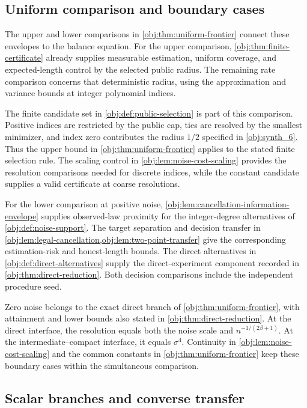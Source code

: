 \documentclass[11pt]{article}
\begin{document}
\subsection{Uniform comparison and boundary cases}

The upper and lower comparisons in \cref{obj:thm:uniform-frontier} connect these envelopes to the balance equation. For the upper comparison, \cref{obj:thm:finite-certificate} already supplies measurable estimation, uniform coverage, and expected-length control by the selected public radius. The remaining rate comparison concerns that deterministic radius, using the approximation and variance bounds at integer polynomial indices.

The finite candidate set in \cref{obj:def:public-selection} is part of this comparison. Positive indices are restricted by the public cap, ties are resolved by the smallest minimizer, and index zero contributes the radius \(1/2\) specified in \cref{obj:synth_6}. Thus the upper bound in \cref{obj:thm:uniform-frontier} applies to the stated finite selection rule. The scaling control in \cref{obj:lem:noise-cost-scaling} provides the resolution comparisons needed for discrete indices, while the constant candidate supplies a valid certificate at coarse resolutions.

For the lower comparison at positive noise, \cref{obj:lem:cancellation-information-envelope} supplies observed-law proximity for the integer-degree alternatives of \cref{obj:def:noise-support}. The target separation and decision transfer in \cref{obj:lem:legal-cancellation,obj:lem:two-point-transfer} give the corresponding estimation-risk and honest-length bounds. The direct alternatives in \cref{obj:def:direct-alternatives} supply the direct-experiment component recorded in \cref{obj:thm:direct-reduction}. Both decision comparisons include the independent procedure seed.

Zero noise belongs to the exact direct branch of \cref{obj:thm:uniform-frontier}, with attainment and lower bounds also stated in \cref{obj:thm:direct-reduction}. At the direct interface, the resolution equals both the noise scale and \(n^{-1/(2\beta+1)}\). At the intermediate--compact interface, it equals \(\sigma^4\). Continuity in \cref{obj:lem:noise-cost-scaling} and the common constants in \cref{obj:thm:uniform-frontier} keep these boundary cases within the simultaneous comparison.

\subsection{Scalar branches and converse transfer}
\end{document}
